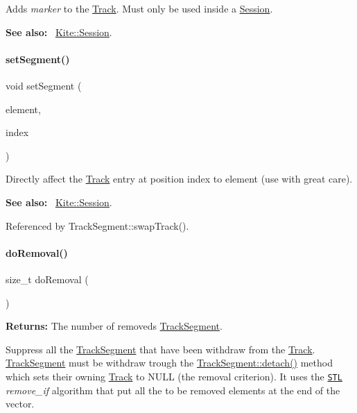 Adds {\itshape marker} to the \mbox{\hyperlink{classKite_1_1Track}{Track}}. Must only be used inside a \mbox{\hyperlink{classKite_1_1Session}{Session}}.

{\bfseries See also\+:}~ \mbox{\hyperlink{classKite_1_1Session}{Kite\+::\+Session}}. \mbox{\label{classKite_1_1Track_a8b5d93406ef581c1be022417238a89ca}} 
\paragraph{\texorpdfstring{set\+Segment()}{setSegment()}}
{\footnotesize\ttfamily void set\+Segment (\begin{DoxyParamCaption}\item[{\mbox{\hyperlink{classKite_1_1TrackElement}{Track\+Element}} $\ast$}]{element,  }\item[{size\+\_\+t}]{index }\end{DoxyParamCaption})}

Directly affect the \mbox{\hyperlink{classKite_1_1Track}{Track}} entry at position {\ttfamily index} to {\ttfamily element} (use with great care).

{\bfseries See also\+:}~ \mbox{\hyperlink{classKite_1_1Session}{Kite\+::\+Session}}. 

Referenced by Track\+Segment\+::swap\+Track().

\mbox{\label{classKite_1_1Track_abfffcd781865b94f62f27a1e7be99a38}} 
\paragraph{\texorpdfstring{do\+Removal()}{doRemoval()}}
{\footnotesize\ttfamily size\+\_\+t do\+Removal (\begin{DoxyParamCaption}{ }\end{DoxyParamCaption})}

{\bfseries Returns\+:} The number of removeds \mbox{\hyperlink{classKite_1_1TrackSegment}{Track\+Segment}}.

Suppress all the \mbox{\hyperlink{classKite_1_1TrackSegment}{Track\+Segment}} that have been withdraw from the \mbox{\hyperlink{classKite_1_1Track}{Track}}. \mbox{\hyperlink{classKite_1_1TrackSegment}{Track\+Segment}} must be withdraw trough the \mbox{\hyperlink{classKite_1_1TrackSegment_ac295bade8aee589f6718dfa79edc2a34}{Track\+Segment\+::detach()}} method which sets their owning \mbox{\hyperlink{classKite_1_1Track}{Track}} to {\ttfamily N\+U\+LL} (the removal criterion). It uses the \href{http://www.sgi.com/tech/stl/}{\tt S\+TL} {\itshape remove\+\_\+if} algorithm that put all the to be removed elements at the end of the vector.

